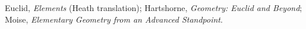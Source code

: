 \begin{remark*}
Euclid, \textit{Elements} (Heath translation);
Hartshorne, \textit{Geometry: Euclid and Beyond};
Moise, \textit{Elementary Geometry from an Advanced Standpoint}.
\end{remark*}

% 
% 
% 
% 
% 
% 
% 
% 

\clearpage



